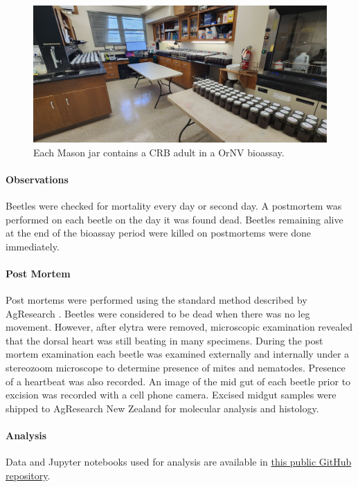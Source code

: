 \documentclass[12pt,letterpaper,english,bibliography=totocnumbered, abstract=on]{scrartcl}
\begin{document}
\begin{figure}[H]
	\centering
	\includegraphics[width=0.7\linewidth]{images/lab}
	\caption{Each Mason jar contains a CRB adult in a OrNV bioassay.}
	\label{fig:lab}
\end{figure}

\paragraph{Observations}

Beetles were checked for mortality every day or second day. A postmortem was performed on each beetle on the day it was found dead. Beetles remaining alive at the end of the bioassay period were killed on postmortems were done immediately.

\paragraph{Post Mortem}

Post mortems were performed using the standard method described by AgResearch \cite{AgResearch2023-OrNV-minitest}. Beetles were considered to be dead when there was no leg movement. However, after elytra were removed, microscopic examination revealed that the dorsal heart was still beating in many specimens. During the post mortem examination each beetle was examined externally and internally under a stereozoom microscope to determine presence of mites and nematodes. Presence of a heartbeat was also recorded. An image of the mid gut of each beetle prior to excision was recorded with a cell phone camera. 
Excised midgut samples were shipped to AgResearch New Zealand for molecular analysis and histology.

\paragraph{Analysis}

Data and Jupyter notebooks used for analysis are available in \href{https://github.com/aubreymoore/ornv-bioassay-db}{this public GitHub repository}. 
\end{document}
